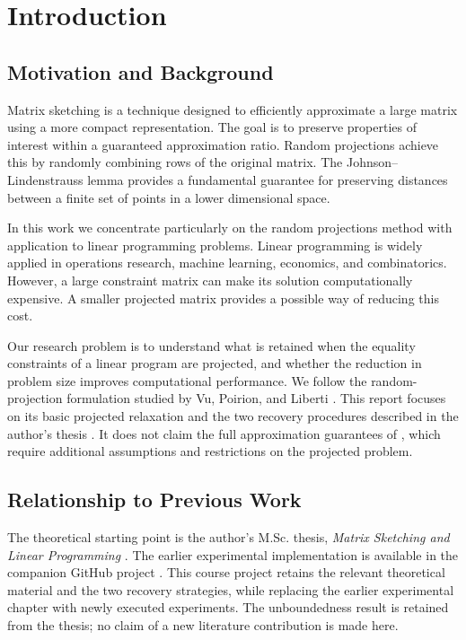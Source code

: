 \documentclass[12pt,letterpaper,oneside]{report}
\theoremstyle{definition}
\begin{document}
\chapter{Introduction}
\section{Motivation and Background}
Matrix sketching is a technique designed to efficiently approximate a
large matrix using a more compact representation. The goal is to preserve
properties of interest within a guaranteed approximation ratio. Random
projections achieve this by randomly combining rows of the original
matrix. The Johnson--Lindenstrauss lemma provides a fundamental guarantee
for preserving distances between a finite set of points in a lower
dimensional space.

In this work we concentrate particularly on the random projections
method with application to linear programming problems. Linear
programming is widely applied in operations research, machine learning,
economics, and combinatorics. However, a large constraint matrix can make
its solution computationally expensive. A smaller projected matrix
provides a possible way of reducing this cost.

Our research problem is to understand what is retained when the equality
constraints of a linear program are projected, and whether the reduction
in problem size improves computational performance. We follow the
random-projection formulation studied by Vu, Poirion, and Liberti
\cite{vu2018}. This report focuses on its basic projected relaxation and
the two recovery procedures described in the author's thesis
\cite{thesis2025}. It does not
claim the full approximation guarantees of \cite{vu2018}, which require
additional assumptions and restrictions on the projected problem.

\section{Relationship to Previous Work}
The theoretical starting point is the author's M.Sc. thesis,
\emph{Matrix Sketching and Linear Programming} \cite{thesis2025}.
The earlier experimental implementation is available in the companion
GitHub project \cite{legacyrepo}. This course project retains the
relevant theoretical material and the two recovery strategies, while
replacing the earlier experimental chapter with newly executed
experiments. The unboundedness result is retained from the thesis;
no claim of a new literature contribution is made here.
\end{document}
